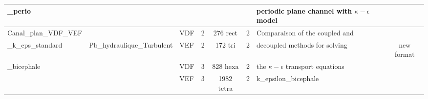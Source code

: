 \begin{table}[H]
\begin{centering}
\begin{tabular}{lclccclc}
\rowcolor{SkyBlue!10}\_perio & & & & & & periodic plane channel with $\kappa-\epsilon$ model & \\
\hline
\rowcolor{SkyBlue!10}Canal\_plan\_VDF\_VEF & & VDF & 2 & 276 rect & 2 & Comparaison of the coupled and  & \\ 
\rowcolor{SkyBlue!10}\_k\_eps\_standard & Pb\_hydraulique\_Turbulent & VEF & 2 & 172 tri & 2 & decoupled methods for solving  & new format \\
\rowcolor{SkyBlue!10}\_bicephale & & VDF & 3 & 828 hexa & 2 & the $\kappa-\epsilon$ transport equations & \\ 
\rowcolor{SkyBlue!10} & & VEF & 3 & 1982 tetra & 2 & k\_epsilon\_bicephale & \\ 
\hline
\end{tabular}
\end{centering}
\end{table}

\newpage

